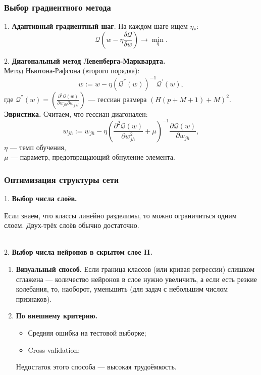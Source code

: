 \documentclass[unicode, notheorems]{beamer}
\begin{document}
\begin{frame}
	\frametitle{Выбор градиентного метода}
	1. \textbf{Адаптивный градиентный шаг}. На каждом шаге ищем $\eta_*$:
	\[
	\mathscr{Q}(w - \eta \frac{\delta\mathscr{Q}}{\delta w}) \rightarrow \min_\eta.
	\]

	2. \textbf{Диагональный метод Левенберга-Марквардта.}\\
	Метод Ньютона-Рафсона (второго порядка):
	\[
	w := w - \eta (\mathscr{Q}^{''}(w))^{-1} \mathscr{Q}^{'}(w),
\]
\small{	где $\mathscr{Q}^{''}(w) = \left( \frac{\partial^2 \mathscr{Q}(w) }{\partial w_{jh} \partial w_{j^{'}h^{'}}}   \right)$ --- гессиан размера $(H(p+M+1) + M)^2$}.\\

	\textbf{Эвристика.} Считаем, что гессиан диагонален:
\[
	w_{jh} := w_{jh} - \eta \left(  \frac{\partial^2 \mathscr{Q}(w) }{\partial w_{jh}^2} + \mu  \right) ^{-1} \frac{\partial \mathscr{Q}(w) }{\partial w_{jh}}, 
\]  
	$\eta$ --- темп обучения, \\
	$\mu$ --- параметр, предотвращающий обнуление элемента.
\end{frame} 

\begin{frame}
	\frametitle{Оптимизация структуры сети}
	
	1. \textbf{Выбор числа слоёв.}
	
	Если знаем, что классы линейно разделимы, то можно ограничиться одним слоем. Двух-трёх слоёв обычно достаточно.  

		\vspace{0.6 cm}\\
	2. \textbf{Выбор числа нейронов в скрытом слое H.} \\ 
	\begin{enumerate}
		\item \textbf{Визуальный способ.} Если граница классов (или кривая регрессии) слишком сглажена --- количество нейронов в слое нужно увеличить, а если есть резкие колебания, то, наоборот, уменьшить (для задач с небольшим числом признаков).
		\item \textbf{По внешнему критерию.} 
		\begin{itemize}
			\item Средняя ошибка на тестовой выборке; 
			\item Cross-validation;
		\end{itemize}
		 Недостаток этого способа --- высокая трудоёмкость.
	\end{enumerate}
	
\end{frame}
\end{document}
